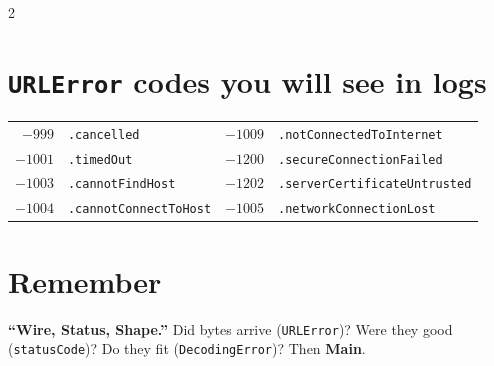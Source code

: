 \documentclass[8pt]{extarticle}
\begin{document}
\begin{multicols}{2}
\section{\texttt{URLError} codes you will see in logs}
{\footnotesize
\begin{tabular}{@{}r l r l@{}}
\toprule
$-999$ & \texttt{.cancelled} & $-1009$ & \texttt{.notConnectedToInternet} \\
$-1001$ & \texttt{.timedOut} & $-1200$ & \texttt{.secureConnectionFailed} \\
$-1003$ & \texttt{.cannotFindHost} & $-1202$ & \texttt{.serverCertificateUntrusted} \\
$-1004$ & \texttt{.cannotConnectToHost} & $-1005$ & \texttt{.networkConnectionLost} \\
\bottomrule
\end{tabular}}

\section{Remember}
\textbf{``Wire, Status, Shape.''} Did bytes arrive (\texttt{URLError})? Were they good
(\texttt{statusCode})? Do they fit (\texttt{DecodingError})? Then \textbf{Main}.


\end{multicols}

\end{document}
